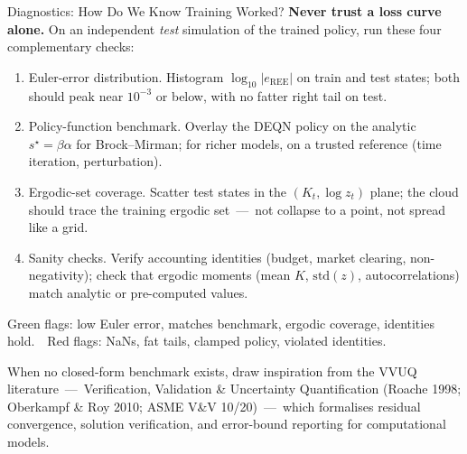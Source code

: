 \documentclass[aspectratio=169,11pt]{beamer}
\newcommand{\emphc}[1]{\textcolor{harvardcrimson}{#1}}
\begin{document}
\begin{frame}{Diagnostics: How Do We Know Training Worked?}
\footnotesize
\textbf{Never trust a loss curve alone.}  On an independent \emph{test} simulation of the trained policy, run these four complementary checks:

\vspace{0.3em}
\begin{enumerate}\itemsep2pt
    \item \emphc{Euler-error distribution.}  Histogram $\log_{10}|e_{\mathrm{REE}}|$ on train and test states; both should peak near $10^{-3}$ or below, with no fatter right tail on test.
    \item \emphc{Policy-function benchmark.}  Overlay the DEQN policy on the analytic $s^\star=\beta\alpha$ for Brock--Mirman; for richer models, on a trusted reference (time iteration, perturbation).
    \item \emphc{Ergodic-set coverage.}  Scatter test states in the $(K_t,\log z_t)$ plane; the cloud should trace the training ergodic set~---~not collapse to a point, not spread like a grid.
    \item \emphc{Sanity checks.}  Verify accounting identities (budget, market clearing, non-negativity); check that ergodic moments (mean $K$, $\mathrm{std}(z)$, autocorrelations) match analytic or pre-computed values.
\end{enumerate}

\vspace{0.3em}
\begin{center}
{\scriptsize \emphc{Green flags:} low Euler error, matches benchmark, ergodic coverage, identities hold.\ \ \emphc{Red flags:} NaNs, fat tails, clamped policy, violated identities.}
\end{center}

\vspace{0.1em}
{\scriptsize When no closed-form benchmark exists, draw inspiration from the \emphc{VVUQ literature}~---~Verification, Validation \& Uncertainty Quantification (Roache 1998; Oberkampf \& Roy 2010; ASME V\&V 10/20)~---~which formalises residual convergence, solution verification, and error-bound reporting for computational models.}
\end{frame}
\end{document}
